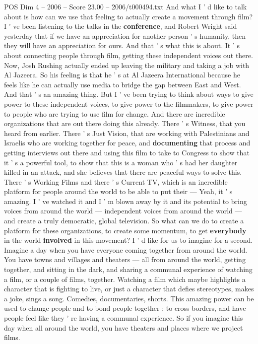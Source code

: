 \begin{textsample}{POS Dim 4 – 2006 – Score 23.00 – 2006/t000494.txt}
And what I ' d like to talk about is how can we use that feeling to actually create a movement through film?
I ' ve been listening to the talks in the \textbf{conference}, and Robert Wright said yesterday that if we have an appreciation for another person ' s humanity, then they will have an appreciation for ours.
And that ' s what this is about.
It ' s about connecting people through film, getting these independent voices out there.
Now, Josh Rushing actually ended up leaving the military and taking a job with Al Jazeera.
So his feeling is that he ' s at Al Jazeera International because he feels like he can actually use media to bridge the gap between East and West.
And that ' s an amazing thing.
But I ' ve been trying to think about ways to give power to these independent voices, to give power to the filmmakers, to give power to people who are trying to use film for change.
And there are incredible organizations that are out there doing this already.
There ' s Witness, that you heard from earlier.
There ' s Just Vision, that are working with Palestinians and Israelis who are working together for peace, and \textbf{documenting} that process and getting interviews out there and using this film to take to Congress to show that it ' s a powerful tool, to show that this is a woman who ' s had her daughter killed in an attack, and she believes that there are peaceful ways to solve this.
There ' s Working Films and there ' s Current TV, which is an incredible platform for people around the world to be able to put their — Yeah, it ' s amazing.
I ' ve watched it and I ' m blown away by it and its potential to bring voices from around the world — independent voices from around the world — and create a truly democratic, global television.
So what can we do to create a platform for these organizations, to create some momentum, to get \textbf{everybody} in the world \textbf{involved} in this movement?
I ' d like for us to imagine for a second.
Imagine a day when you have everyone coming together from around the world.
You have towns and villages and theaters — all from around the world, getting together, and sitting in the dark, and sharing a communal experience of watching a film, or a couple of films, together.
Watching a film which maybe highlights a character that is fighting to live, or just a character that defies stereotypes, makes a joke, sings a song.
Comedies, documentaries, shorts.
This amazing power can be used to change people and to bond people together ; to cross borders, and have people feel like they ' re having a communal experience.
So if you imagine this day when all around the world, you have theaters and places where we project films.

\end{textsample}

